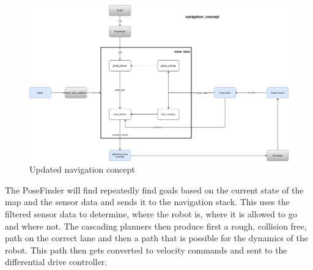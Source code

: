 \begin{figure}[H]
	\begin{center}
		\includegraphics[width=140mm]{Pictures/Updated navigation concept}
		\caption[updated navigation concept]{Updated navigation concept}
	\end{center}
\end{figure}



The PoseFinder will find repeatedly find goals based on the current state of the map and the sensor data and sends it to the navigation stack. This uses the filtered sensor data to determine, where the robot is, where it is allowed to go and where not. The cascading planners then produce first a rough, collision free, path on the correct lane and then a path that is possible for the dynamics of the robot. This path then gets converted to velocity commands and sent to the differential drive controller.\\




